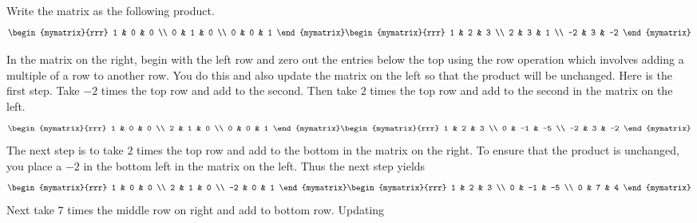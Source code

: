 \begin{solution}

Write the matrix as the following product.
\begin{equation*}
\begin{mymatrix}{rrr}
1 & 0 & 0 \\
0 & 1 & 0 \\
0 & 0 & 1
\end{mymatrix} \begin{mymatrix}{rrr}
1 & 2 & 3 \\
2 & 3 & 1 \\
-2 & 3 & -2
\end{mymatrix}
\end{equation*}

In the matrix on the right, begin with the left row and zero
out the entries below the top using the row operation which involves adding
a multiple of a row to another row. You do this and also update the matrix
on the left so that the product will be unchanged. Here is the first step.
Take $-2$ times the top row and add to the second. Then take $2$ times the
top row and add to the second in the matrix on the left.
\begin{equation*}
\begin{mymatrix}{rrr}
1 & 0 & 0 \\
2 & 1 & 0 \\
0 & 0 & 1
\end{mymatrix} \begin{mymatrix}{rrr}
1 & 2 & 3 \\
0 & -1 & -5 \\
-2 & 3 & -2
\end{mymatrix}
\end{equation*}
The next step is to take $2$ times the top row and add to the bottom in the
matrix on the right. To ensure that the product is unchanged, you place a $%
-2 $ in the bottom left in the matrix on the left. Thus the next step yields
\begin{equation*}
\begin{mymatrix}{rrr}
1 & 0 & 0 \\
2 & 1 & 0 \\
-2 & 0 & 1
\end{mymatrix} \begin{mymatrix}{rrr}
1 & 2 & 3 \\
0 & -1 & -5 \\
0 & 7 & 4
\end{mymatrix}
\end{equation*}
Next take $7$ times the middle row on right and add to bottom row. Updating

\end{solution}
